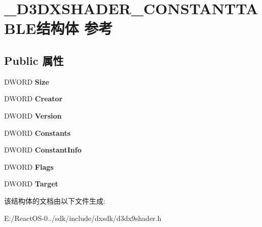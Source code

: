 \hypertarget{struct___d3_d_x_s_h_a_d_e_r___c_o_n_s_t_a_n_t_t_a_b_l_e}{}\section{\+\_\+\+D3\+D\+X\+S\+H\+A\+D\+E\+R\+\_\+\+C\+O\+N\+S\+T\+A\+N\+T\+T\+A\+B\+L\+E结构体 参考}
\label{struct___d3_d_x_s_h_a_d_e_r___c_o_n_s_t_a_n_t_t_a_b_l_e}
\subsection*{Public 属性}
\begin{DoxyCompactItemize}
\item 
\mbox{\label{struct___d3_d_x_s_h_a_d_e_r___c_o_n_s_t_a_n_t_t_a_b_l_e_ace1dd9530b0880daab02e055fb84d89c}} 
D\+W\+O\+RD {\bfseries Size}
\item 
\mbox{\label{struct___d3_d_x_s_h_a_d_e_r___c_o_n_s_t_a_n_t_t_a_b_l_e_a4ac4d2541c503163a2ed67ef6e533773}} 
D\+W\+O\+RD {\bfseries Creator}
\item 
\mbox{\label{struct___d3_d_x_s_h_a_d_e_r___c_o_n_s_t_a_n_t_t_a_b_l_e_a1091f71d65632c9b25f48ff172f225be}} 
D\+W\+O\+RD {\bfseries Version}
\item 
\mbox{\label{struct___d3_d_x_s_h_a_d_e_r___c_o_n_s_t_a_n_t_t_a_b_l_e_a091114e791baf2443f05288765d23090}} 
D\+W\+O\+RD {\bfseries Constants}
\item 
\mbox{\label{struct___d3_d_x_s_h_a_d_e_r___c_o_n_s_t_a_n_t_t_a_b_l_e_a443df036472910eb5f585067c253e7a2}} 
D\+W\+O\+RD {\bfseries Constant\+Info}
\item 
\mbox{\label{struct___d3_d_x_s_h_a_d_e_r___c_o_n_s_t_a_n_t_t_a_b_l_e_ab921f84489abd2c40d0f7d7c0ff90349}} 
D\+W\+O\+RD {\bfseries Flags}
\item 
\mbox{\label{struct___d3_d_x_s_h_a_d_e_r___c_o_n_s_t_a_n_t_t_a_b_l_e_a1e4fac0f5865a23b0616e696e92cfe5d}} 
D\+W\+O\+RD {\bfseries Target}
\end{DoxyCompactItemize}


该结构体的文档由以下文件生成\+:\begin{DoxyCompactItemize}
\item 
E\+:/\+React\+O\+S-\/0../sdk/include/dxsdk/d3dx9shader.\+h\end{DoxyCompactItemize}
